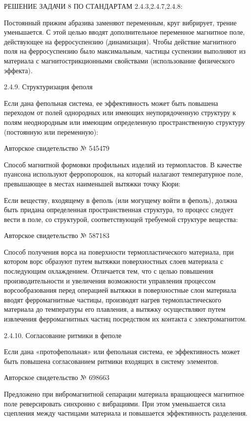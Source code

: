 РЕШЕНИЕ ЗАДАЧИ 8 ПО СТАНДАРТАМ 2.4.3,2.4.7,2.4.8:

Постоянный  прижим  абразива   заменяют  переменным,  круг  вибрирует,
трение  уменьшается. С  этой  целью  вводят дополнительное  переменное
магнитное  поле, действующее  на  ферросуспензию (динамизация).  Чтобы
действие магнитного поля на  ферросуспензию было максимальным, частицы
суспензии  выполняют из  материала  с магнитострикционными  свойствами
(использование физического эффекта).


2.4.9. Структуризация феполя

Если  дана фепольная  система,  ее эффективность  может быть  повышена
переходом от полей однородных  или имеющих неупорядоченную структуру к
полям неоднородным или имеющим определенную пространственную структуру
(постоянную или переменную):


Авторское свидетельство № 545479

Способ  магнитной  формовки  профильных  изделий  из  термопластов.  В
качестве  пуансона   используют  ферропорошок,  на   который  налагают
температурное  поле, превышающее  в  местах  наименьшей вытяжки  точку
Кюри:

Если  веществу, входящему  в  феполь (или  могущему  войти в  феполь),
должна  быть  придана   определенная  пространственная  структура,  то
процесс следует вести в поле, со структурой, соответствующей требуемой
структуре вещества:


Авторское свидетельство № 587183

Способ  получения ворса  на поверхности  термопластического материала,
при   котором  ворс   образуют  путем   вытяжки  поверхностных   слоев
материала  с  последующим охлаждением.  Отличается  тем,  что с  целью
повышения  производительности  и   увеличения  возможности  управления
процессом  ворсообразования перед  операцией  вытяжки в  поверхностные
слои  материала  вводят   ферромагнитные  частицы,  производят  нагрев
термопластического материала  до температуры его плавления,  а вытяжку
осуществляют  путем извлечения  ферромагнитных  частиц посредством  их
контакта с электромагнитом.


2.4.10. Согласование ритмики в феполе

Если  дана «протофепольная»  или фепольная  система, ее  эффективность
может  быть   повышена  согласованием   ритмики  входящих   в  систему
элементов.


Авторское свидетельство № 698663

Предложено   при   вибромагнитной  сепарации   материала   вращающееся
магнитное  поле   реверсировать  синхронно  с  вибрациями.   При  этом
уменьшается  сила сцепления  между  частицами  материала и  повышается
эффективность разделения.


